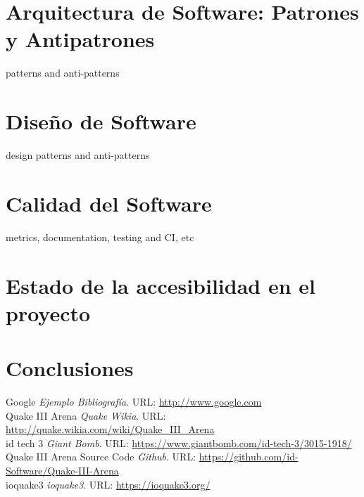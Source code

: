 \documentclass[a4paper,12pt]{report}
\begin{document}
	\section{Arquitectura de Software: Patrones y Antipatrones}
	patterns and anti-patterns\\
		
	\section{Diseño de Software}
	design patterns and anti-patterns\\
	
	\section{Calidad del Software}
	metrics, documentation, testing and CI, etc\\
	
	\section{Estado de la accesibilidad en el proyecto}
	
	\section{Conclusiones}
			
	
	
	
	
	
	\begin{thebibliography}{9}
		
		Google \emph{Ejemplo Bibliografía}. URL: \url{http://www.google.com}\\
		Quake III Arena \emph{Quake Wikia}. URL: \url{http://quake.wikia.com/wiki/Quake_III_Arena}\\
		 id tech 3 \emph{Giant Bomb}. URL: \url{https://www.giantbomb.com/id-tech-3/3015-1918/}\\
		 Quake III Arena Source Code \emph{Github}. URL: \url{https://github.com/id-Software/Quake-III-Arena}\\
		 ioquake3 \emph{ioquake3}. URL: \url{https://ioquake3.org/}
		
		
	\end{thebibliography}
	
	
\end{document}
